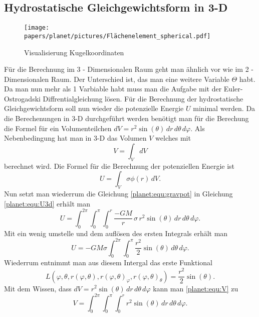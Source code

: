 \subsection{Hydrostatische Gleichgewichtsform in 3-D}
\begin{figure}
	\centering
	\texttt{[image: papers/planet/pictures/Flächenelement\_spherical.pdf]}
	\caption{Visualisierung Kugelkoordinaten}
\end{figure}
Für die Berechnung im 3 - Dimensionalen Raum geht man ähnlich vor wie im 2 - Dimensionalen Raum.
Der Unterschied ist, das man eine weitere Variable \(\Theta\) habt.
Da man nun mehr als 1 Varbiable habt muss man die Aufgabe mit der Euler-Ostrogadski Diffrentialgleichung lösen.
Für die Berechnung der hydrostatische Gleichgewichtsform soll nun wieder die potenzielle Energie \(U\) minimal werden.
Da die Berechenungen in 3-D durchgeführt werden benötigt man für die Berechung die Formel für ein Volumenteilchen \(dV = r^2 \sin (\theta) \, dr \, d\theta \, d\varphi \).
Als Nebenbedingung hat man in 3-D das Volumen \(V\) welches mit 
\begin{equation}
	V = \int_{V}^{} dV
	\label{planet:equ:V}
\end{equation}
berechnet wird.
Die Formel für die Berechnung der potenziellen Energie ist
\begin{equation}
	U = \int_{V} \sigma  \phi (r)\, dV.
	\label{planet:equ:U3d}
\end{equation}
Nun setzt man wiederrum die Gleichung \ref{planet:equ:gravpot} in Gleichung \ref{planet:equ:U3d} erhält man
\begin{equation*}
	U = \int_{0}^{2\pi}\int_{0}^{\pi}\int_{0}^{r} \frac{-GM}{r}\, \sigma\, r^2 \sin (\theta) \, dr \, d\theta \, d\varphi.
\end{equation*}
Mit ein wenig umstelle und dem auflösen des ersten Integrals erhält man
\begin{equation*}
	U =-GM\sigma \int_{0}^{2\pi}\int_{0}^{\pi}\frac{r^2}{2}  \sin (\theta) \, d\theta \, d\varphi.
\end{equation*}
Wiederrum entnimmt man aus diesem Intergal das erste Funktional
\begin{equation*}
	L(\varphi,\theta ,r(\varphi,\theta),r(\varphi,\theta)_\varphi,r(\varphi,\theta)_\theta) = \frac{r^2}{2}  \sin (\theta).
\end{equation*}
Mit dem Wissen, dass \(dV = r^2 \sin (\theta) \, dr \, d\theta \, d\varphi \) kann man \ref{planet:equ:V} zu
\begin{equation*}
	V = \int_{0}^{2\pi}\int_{0}^{\pi}\int_{0}^{r} r^2 \sin (\theta) \, dr \, d\theta \, d\varphi.
\end{equation*}
